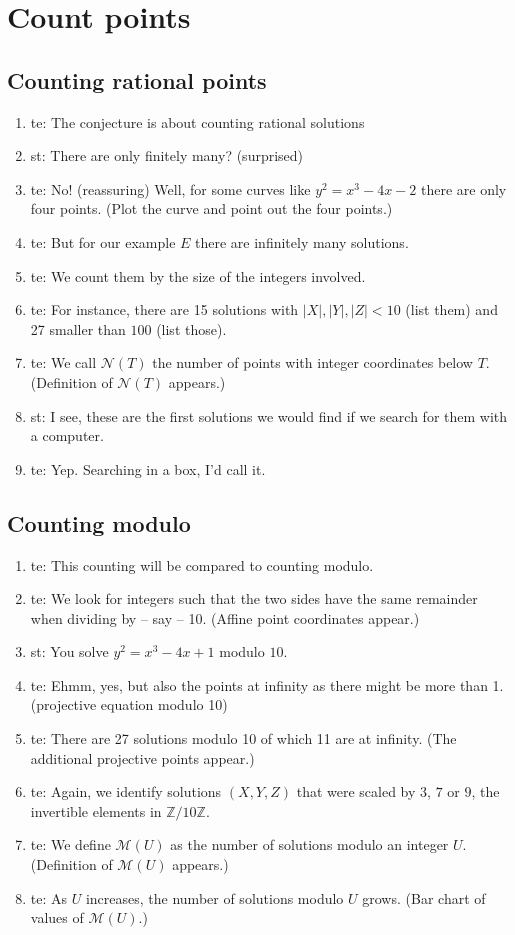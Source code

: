 \documentclass[a4paper]{article}
\newcommand{\ZZ}{\mathbb{Z}}
\begin{document}
\section{Count points}
\subsection{Counting rational points}
\begin{enumerate}
  \item te: The conjecture is about counting rational solutions
  \item st: There are only finitely many? (surprised)
  \item te: No! (reassuring) Well, for some curves like $y^2=x^3-4x-2$ there are only four points. (Plot the curve and point out the four points.)
  \item te: But for our example $E$ there are infinitely many solutions.
  \item te: We count them by the size of the integers involved.
  \item te: For instance, there are 15 solutions with $\lvert X\rvert, \lvert Y\rvert, \lvert Z\rvert < 10$ (list them) and 27 smaller than $100$ (list those).
 \item te: We call $\mathcal{N}(T)$ the number of points with integer coordinates below $T$. (Definition of $\mathcal{N}(T)$ appears.)
  \item st: I see, these are the first solutions we would find if we search for them with a computer.
  \item te: Yep. Searching in a box, I’d call it.
\end{enumerate}

\subsection{Counting modulo}
\begin{enumerate}
 \item te: This counting will be compared to counting modulo.
 \item te: We look for integers such that the two sides have the same remainder when dividing by -- say -- 10. (Affine point coordinates appear.)
 \item st: You solve $y^2 = x^3-4x+1$ modulo $10$.
 \item te: Ehmm, yes, but also the points at infinity as there might be more than 1.
 (projective equation modulo 10)
 \item te: There are 27 solutions modulo 10 of which 11 are at infinity. (The additional projective points appear.)
 \item te: Again, we identify solutions $(X,Y,Z)$ that were scaled by $3$, $7$ or $9$, the invertible elements in $\ZZ/10\ZZ$.
 \item te: We define $\mathcal{M}(U)$ as the number of solutions modulo an integer $U$. (Definition of $\mathcal{M}(U)$ appears.)
\item te: As $U$ increases, the number of solutions modulo $U$ grows. (Bar chart of values of $\mathcal{M}(U)$.)
\end{enumerate}
\end{document}
